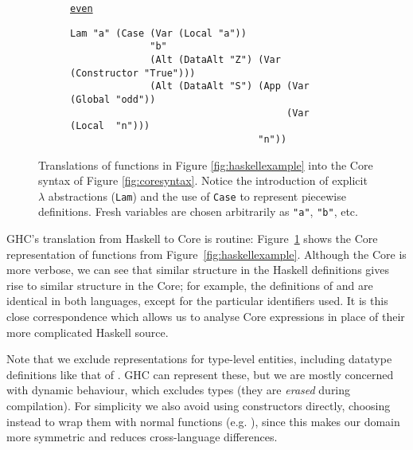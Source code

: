\begin{figure}
\begin{subfigure}[even]{\textwidth}
    \begin{small}
      \underline{\texttt{even}}
      \begin{verbatim}
Lam "a" (Case (Var (Local "a"))
              "b"
              (Alt (DataAlt "Z") (Var (Constructor "True")))
              (Alt (DataAlt "S") (App (Var (Global "odd"))
                                      (Var (Local  "n")))
                                 "n"))
      \end{verbatim}
    \end{small}
  \end{subfigure}
  \caption{Translations of functions in Figure \ref{fig:haskellexample} into the
    Core syntax of Figure \ref{fig:coresyntax}. Notice the introduction of
    explicit $\lambda$ abstractions (\texttt{Lam}) and the use of \texttt{Case}
    to represent piecewise definitions. Fresh variables are chosen arbitrarily
    as \texttt{"a"}, \texttt{"b"}, etc.}
  \label{fig:coreexample}
\end{figure}

GHC's translation from Haskell to Core is routine: Figure~\ref{fig:coreexample}
shows the Core representation of functions from Figure~\ref{fig:haskellexample}.
Although the Core is more verbose, we can see that similar structure in the
Haskell definitions gives rise to similar structure in the Core; for example,
the definitions of  and  are identical in both languages,
except for the particular identifiers used. It is this close correspondence
which allows us to analyse Core expressions in place of their more complicated
Haskell source.

Note that we exclude representations for type-level entities, including datatype
definitions like that of . GHC can represent these, but we are mostly
concerned with dynamic behaviour, which excludes types (they are \emph{erased}
during compilation). For simplicity we also avoid using constructors directly,
choosing instead to wrap them with normal functions (e.g. ), since
this makes our domain more symmetric and reduces cross-language differences.
